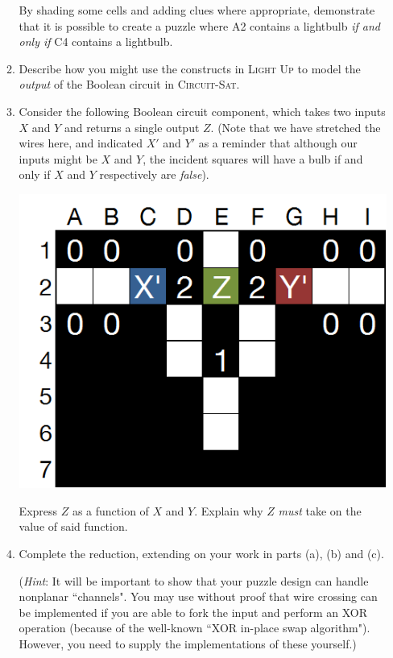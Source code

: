 \documentclass[12pt, a4paper]{article}
\begin{document}
\begin{enumerate}
\begin{enumerate}
By shading some cells and adding clues where appropriate, demonstrate that it is possible
to create a puzzle where A2 contains a lightbulb \textit{if and only if} C4 contains
a lightbulb.

\item Describe how you might use the constructs in \textsc{Light Up} to model the
\textit{output} of the Boolean circuit in \textsc{Circuit-Sat}.

\item Consider the following Boolean circuit component, which takes two inputs $X$ and $Y$
and returns a single output $Z$. (Note that we have stretched the wires here, and
indicated $X'$ and $Y'$ as a reminder that although our inputs might be $X$ and $Y$,
the incident squares will have a bulb if and only if $X$ and $Y$ respectively are 
\textit{false}).

\begin{center}
\includegraphics[scale=0.7]{lightsout5.png}
\end{center}

Express $Z$ as a function of $X$ and $Y$. Explain why $Z$ \textit{must} take on the
value of said function.

\item Complete the reduction, extending on your work in parts (a), (b) and (c).

(\textit{Hint}: It will be important to show that your puzzle design can handle
nonplanar ``channels". You may use without proof that wire crossing can be implemented
if you are able to fork the input and perform an XOR operation (because of the
well-known ``XOR in-place swap algorithm"). However, you need to supply the 
implementations of these yourself.)


\end{enumerate}
\end{enumerate}
\end{document}
